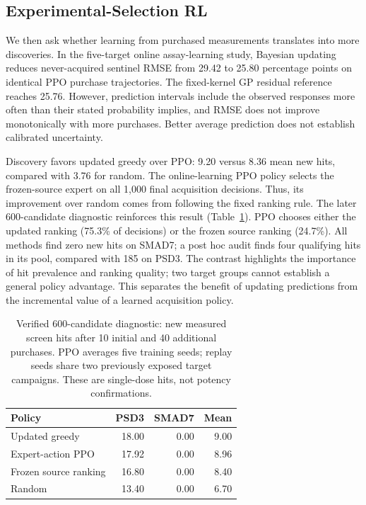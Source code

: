\documentclass[letterpaper]{article}
\begin{document}
\subsection{Experimental-Selection RL}\label{sec:expresults}
We then ask whether learning from purchased measurements translates into more discoveries. In the five-target online assay-learning study, Bayesian updating reduces never-acquired sentinel RMSE from 29.42 to 25.80 percentage points on identical PPO purchase trajectories. The fixed-kernel GP residual reference reaches 25.76. However, prediction intervals include the observed responses more often than their stated probability implies, and RMSE does not improve monotonically with more purchases. Better average prediction does not establish calibrated uncertainty.

Discovery favors updated greedy over PPO: 9.20 versus 8.36 mean new hits, compared with 3.76 for random. The online-learning PPO policy selects the frozen-source expert on all 1,000 final acquisition decisions. Thus, its improvement over random comes from following the fixed ranking rule. The later 600-candidate diagnostic reinforces this result (Table~\ref{tab:assays}). PPO chooses either the updated ranking (75.3\% of decisions) or the frozen source ranking (24.7\%). All methods find zero new hits on SMAD7; a post hoc audit finds four qualifying hits in its pool, compared with 185 on PSD3. The contrast highlights the importance of hit prevalence and ranking quality; two target groups cannot establish a general policy advantage. This separates the benefit of updating predictions from the incremental value of a learned acquisition policy.

\begin{table}[t]
\centering
\begin{tabular}{lrrr}
\toprule
Policy & PSD3 & SMAD7 & Mean\\
\midrule
Updated greedy &18.00&0.00&9.00\\
Expert-action PPO &17.92&0.00&8.96\\
Frozen source ranking &16.80&0.00&8.40\\
Random &13.40&0.00&6.70\\
\bottomrule
\end{tabular}
\caption{Verified 600-candidate diagnostic: new measured screen hits after 10 initial and 40 additional purchases. PPO averages five training seeds; replay seeds share two previously exposed target campaigns. These are single-dose hits, not potency confirmations.}
\label{tab:assays}
\end{table}
\end{document}
